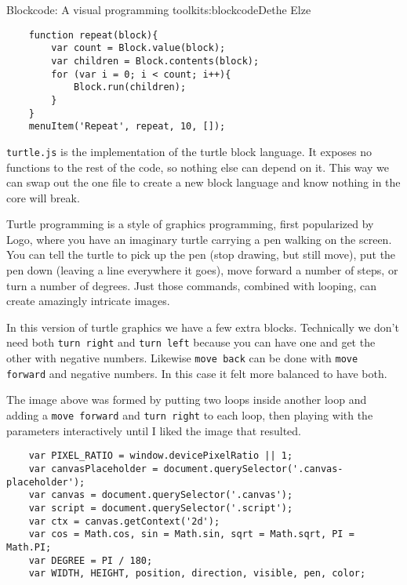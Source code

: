 \begin{aosachapter}{Blockcode: A visual programming toolkit}{s:blockcode}{Dethe Elze}
\begin{verbatim}
    function repeat(block){
        var count = Block.value(block);
        var children = Block.contents(block);
        for (var i = 0; i < count; i++){
            Block.run(children);
        }
    }
    menuItem('Repeat', repeat, 10, []);
\end{verbatim}

\label{turtle.js}

\texttt{turtle.js} is the implementation of the turtle block language.
It exposes no functions to the rest of the code, so nothing else can
depend on it. This way we can swap out the one file to create a new
block language and know nothing in the core will break.


Turtle programming is a style of graphics programming, first popularized
by Logo, where you have an imaginary turtle carrying a pen walking on
the screen. You can tell the turtle to pick up the pen (stop drawing,
but still move), put the pen down (leaving a line everywhere it goes),
move forward a number of steps, or turn a number of degrees. Just those
commands, combined with looping, can create amazingly intricate images.

In this version of turtle graphics we have a few extra blocks.
Technically we don't need both \texttt{turn right} and
\texttt{turn left} because you can have one and get the other with
negative numbers. Likewise \texttt{move back} can be done with
\texttt{move forward} and negative numbers. In this case it felt more
balanced to have both.

The image above was formed by putting two loops inside another loop and
adding a \texttt{move forward} and \texttt{turn right} to each loop,
then playing with the parameters interactively until I liked the image
that resulted.

\begin{verbatim}
    var PIXEL_RATIO = window.devicePixelRatio || 1;
    var canvasPlaceholder = document.querySelector('.canvas-placeholder');
    var canvas = document.querySelector('.canvas');
    var script = document.querySelector('.script');
    var ctx = canvas.getContext('2d');
    var cos = Math.cos, sin = Math.sin, sqrt = Math.sqrt, PI = Math.PI;
    var DEGREE = PI / 180;
    var WIDTH, HEIGHT, position, direction, visible, pen, color;
\end{verbatim}


\end{aosachapter}
